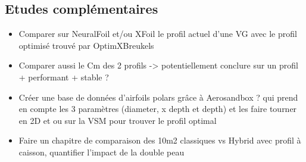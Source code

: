 \subsection{Etudes complémentaires}
\label{sec:Ch4.2}

\begin{itemize}
    \item Comparer sur NeuralFoil et/ou XFoil le profil actuel d’une VG avec le profil optimisé trouvé par OptimXBreukels
    \item Comparer aussi le Cm des 2 profils -> potentiellement conclure sur un profil + performant + stable ?
    \item Créer une base de données d'airfoils polars grâce à Aerosandbox ? qui prend en compte les 3 paramètres (diameter, x depth et depth) et les faire tourner en 2D et ou sur la VSM pour trouver le profil optimal
    \item Faire un chapitre de comparaison des 10m2 classiques vs Hybrid avec profil à caisson, quantifier l'impact de la double peau
\end{itemize}
